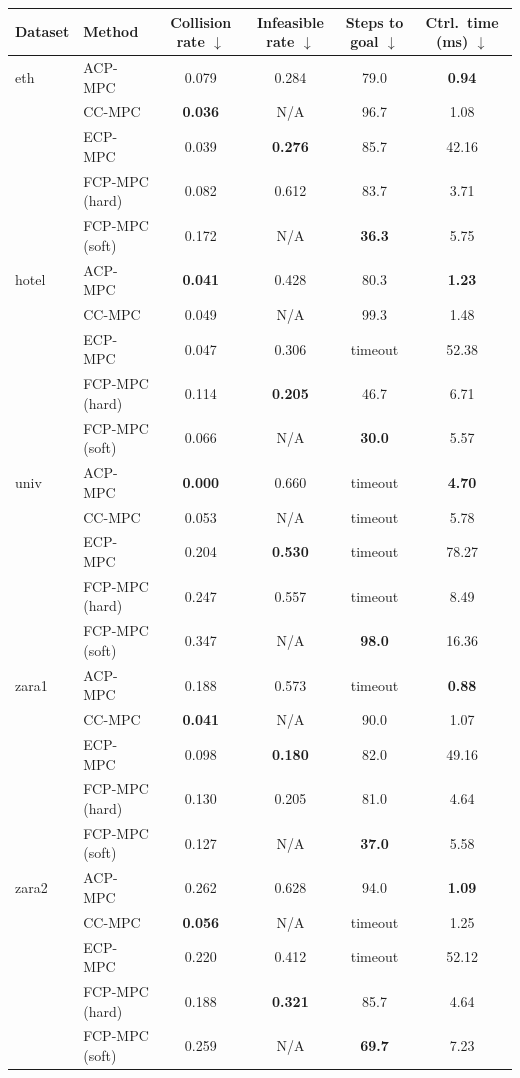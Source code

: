 \begin{tabular}{llcccc}
\hline
Dataset & Method & Collision rate $\downarrow$ & Infeasible rate $\downarrow$ & Steps to goal $\downarrow$ & Ctrl.\ time (ms) $\downarrow$ \\
\hline
eth & ACP-MPC~\cite{dixit2023adaptive} & 0.079 & 0.284 & 79.0 & \textbf{0.94} \\
 & CC-MPC~\cite{lekeufack2024decision} & \textbf{0.036} & N/A & 96.7 & 1.08 \\
 & ECP-MPC~\cite{shin2025egocentric} & 0.039 & \textbf{0.276} & 85.7 & 42.16 \\
 & FCP-MPC (hard) & 0.082 & 0.612 & 83.7 & 3.71 \\
 & FCP-MPC (soft) & 0.172 & N/A & \textbf{36.3} & 5.75 \\
\hline
hotel & ACP-MPC~\cite{dixit2023adaptive} & \textbf{0.041} & 0.428 & 80.3 & \textbf{1.23} \\
 & CC-MPC~\cite{lekeufack2024decision} & 0.049 & N/A & 99.3 & 1.48 \\
 & ECP-MPC~\cite{shin2025egocentric} & 0.047 & 0.306 & timeout & 52.38 \\
 & FCP-MPC (hard) & 0.114 & \textbf{0.205} & 46.7 & 6.71 \\
 & FCP-MPC (soft) & 0.066 & N/A & \textbf{30.0} & 5.57 \\
\hline
univ & ACP-MPC~\cite{dixit2023adaptive} & \textbf{0.000} & 0.660 & timeout & \textbf{4.70} \\
 & CC-MPC~\cite{lekeufack2024decision} & 0.053 & N/A & timeout & 5.78 \\
 & ECP-MPC~\cite{shin2025egocentric} & 0.204 & \textbf{0.530} & timeout & 78.27 \\
 & FCP-MPC (hard) & 0.247 & 0.557 & timeout & 8.49 \\
 & FCP-MPC (soft) & 0.347 & N/A & \textbf{98.0} & 16.36 \\
\hline
zara1 & ACP-MPC~\cite{dixit2023adaptive} & 0.188 & 0.573 & timeout & \textbf{0.88} \\
 & CC-MPC~\cite{lekeufack2024decision} & \textbf{0.041} & N/A & 90.0 & 1.07 \\
 & ECP-MPC~\cite{shin2025egocentric} & 0.098 & \textbf{0.180} & 82.0 & 49.16 \\
 & FCP-MPC (hard) & 0.130 & 0.205 & 81.0 & 4.64 \\
 & FCP-MPC (soft) & 0.127 & N/A & \textbf{37.0} & 5.58 \\
\hline
zara2 & ACP-MPC~\cite{dixit2023adaptive} & 0.262 & 0.628 & 94.0 & \textbf{1.09} \\
 & CC-MPC~\cite{lekeufack2024decision} & \textbf{0.056} & N/A & timeout & 1.25 \\
 & ECP-MPC~\cite{shin2025egocentric} & 0.220 & 0.412 & timeout & 52.12 \\
 & FCP-MPC (hard) & 0.188 & \textbf{0.321} & 85.7 & 4.64 \\
 & FCP-MPC (soft) & 0.259 & N/A & \textbf{69.7} & 7.23 \\
\hline
\end{tabular}